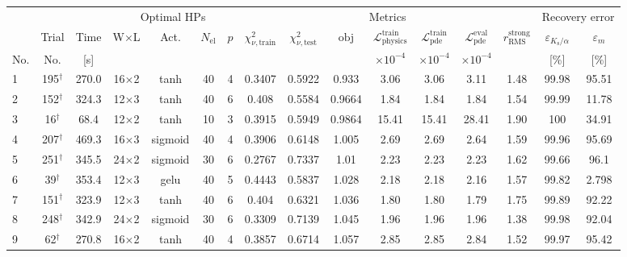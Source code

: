 \begin{tabular}{lcc cccc ccccccc cc}
\toprule
& & & \multicolumn{4}{c}{Optimal HPs} & \multicolumn{7}{c}{Metrics} & \multicolumn{2}{c}{Recovery error} \\
\cmidrule(lr){4-7}\cmidrule(lr){8-14}\cmidrule(lr){15-16}
& Trial & Time & W$\times$L & Act. & $N_{\mathrm{el}}$ & $p$ & $\chi^2_{\nu,\mathrm{train}}$ & $\chi^2_{\nu,\mathrm{test}}$ & $\mathrm{obj}$ & $\mathcal{L}_{\mathrm{physics}}^{\mathrm{train}}$ & $\mathcal{L}_{\mathrm{pde}}^{\mathrm{train}}$ & $\mathcal{L}_{\mathrm{pde}}^{\mathrm{eval}}$ & $r_{\mathrm{RMS}}^{\mathrm{strong}}$ & $\varepsilon_{K_{\mathrm{s}}/\alpha}$ & $\varepsilon_{m}$ \\
No. & No. & [s] &  &  &  &  &  &  &  & $\times 10^{-4}$ & $\times 10^{-4}$ & $\times 10^{-4}$ &  & [\%] & [\%] \\
\midrule
  1 & 195$^\dagger$ & 270.0 & 16$\times$2 & tanh & 40 & 4 & \num{0.3407} & \num{0.5922} & \num{0.933} & 3.06 & 3.06 & 3.11 & 1.48 & \num{99.98} & \num{95.51} \\
  2 & 152$^\dagger$ & 324.3 & 12$\times$3 & tanh & 40 & 6 & \num{0.408} & \num{0.5584} & \num{0.9664} & 1.84 & 1.84 & 1.84 & 1.54 & \num{99.99} & \num{11.78} \\
  3 & 16$^\dagger$ & 68.4 & 12$\times$2 & tanh & 10 & 3 & \num{0.3915} & \num{0.5949} & \num{0.9864} & 15.41 & 15.41 & 28.41 & 1.90 & \num{100} & \num{34.91} \\
  4 & 207$^\dagger$ & 469.3 & 16$\times$3 & sigmoid & 40 & 4 & \num{0.3906} & \num{0.6148} & \num{1.005} & 2.69 & 2.69 & 2.64 & 1.59 & \num{99.96} & \num{95.69} \\
  5 & 251$^\dagger$ & 345.5 & 24$\times$2 & sigmoid & 30 & 6 & \num{0.2767} & \num{0.7337} & \num{1.01} & 2.23 & 2.23 & 2.23 & 1.62 & \num{99.66} & \num{96.1} \\
  6 & 39$^\dagger$ & 353.4 & 12$\times$3 & gelu & 40 & 5 & \num{0.4443} & \num{0.5837} & \num{1.028} & 2.18 & 2.18 & 2.16 & 1.57 & \num{99.82} & \num{2.798} \\
  7 & 151$^\dagger$ & 323.9 & 12$\times$3 & tanh & 40 & 6 & \num{0.404} & \num{0.6321} & \num{1.036} & 1.80 & 1.80 & 1.79 & 1.75 & \num{99.89} & \num{92.22} \\
  8 & 248$^\dagger$ & 342.9 & 24$\times$2 & sigmoid & 30 & 6 & \num{0.3309} & \num{0.7139} & \num{1.045} & 1.96 & 1.96 & 1.96 & 1.38 & \num{99.98} & \num{92.04} \\
  9 & 62$^\dagger$ & 270.8 & 16$\times$2 & tanh & 40 & 4 & \num{0.3857} & \num{0.6714} & \num{1.057} & 2.85 & 2.85 & 2.84 & 1.52 & \num{99.97} & \num{95.42} \\

\end{tabular}
